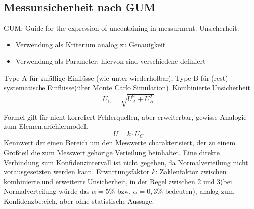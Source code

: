 \documentclass[12pt]{article}
\begin{document}
\subsection{Messunsicherheit nach GUM}
GUM: Guide for the expression of uncentaining in measurment. \newline
Unsicherheit: 
\begin{itemize}
\item Verwendung als Kriterium analog zu Genauigkeit
\item Verwendung als Parameter; hiervon sind verschiedene definiert
\end{itemize}
Type A für zufällige Einflüsse (wie unter wiederholbar), Type B für (rest) systematische Einflüsse(über Monte Carlo Simulation). \newline
Kombinierte Unsicherheit
\begin{gather*}
U_C = \sqrt{U_A^2 + U_B^2} \\
\end{gather*}
Formel gilt für nicht korreliert Fehlerquellen, aber erweiterbar, gewisse Analogie zum Elementarfehlermodell.	
\begin{equation*}
U = k \cdot U_C
\end{equation*}
Kennwert der einen Bereich um den Messwerte charakterisiert, der zu einem Großteil die zum Messwert gehörige Verteilung beinhaltet.\newline
Eine direkte Verbindung zum Konfidenzintervall ist nicht gegeben, da Normalverteilung nicht vorausgesetzten werden kann.\newline
Erwartungsfaktor $k$: Zahlenfaktor zwischen kombinierte und erweiterte Unsicherheit, in der Regel zwischen 2 und 3(bei Normalverteilung würde das $\alpha = 5\%	$ bzw. $\alpha =0,3\%$ bedeuten), analog zum Konfidenzbereich, aber ohne statistische Aussage. 
\end{document}
